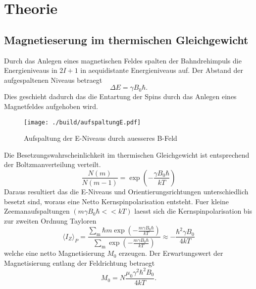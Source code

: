 \section{Theorie}%
\label{sec:theorie}

\subsection{Magnetieserung im thermischen Gleichgewicht}%
\label{ssub:magnetieserung_im_thermischen_gleichgewicht}
Durch das Anlegen eines magnetischen Feldes spalten der Bahndrehimpuls die Energieniveaus in $2 I
+ 1$ in aequidistante Energieniveaus auf. 
Der Abstand der aufgespaltenen Niveaus betraegt 
\begin{equation}
		\label{eq:delta_e}
		\Delta E = \gamma B_0 \hbar. 
\end{equation}
Dies geschieht dadurch das die Entartung der Spins durch das Anlegen eines
Magnetfeldes aufgehoben wird.
\begin{figure}[ht]
		\centering
		\texttt{[image: ./build/aufspaltungE.pdf]}
		\caption{Aufspaltung der E-Niveaus durch auesseres B-Feld}
		\label{fig:aufsp_E}
\end{figure}
Die Besetzungswahrscheinlichkeit im thermischen Gleichgewicht ist entsprechend
der Boltzmanverteilung verteilt.
\begin{equation}
		\label{eq:boltzmann}
		\frac{N(m)}{N(m-1)} = \exp \left( - \frac{\gamma B_0 \hbar}{kT} \right)
\end{equation}
Daraus resultiert das die E-Niveaus und Orientierungsrichtungen unterschiedlich
besetzt sind, woraus eine Netto Kernspinpolarisation entsteht. 
Fuer kleine Zeemanaufspaltungen $(m \gamma B_0 \hbar << kT)$ laesst sich die Kernspinpolarisation bis zur
zweiten Ordnung Tayloren 
\begin{equation}
		\label{eq:kernpo}
		\langle I_Z \rangle_P = \frac{\sum_\text{m} \hbar m \exp\left(-\frac{m \gamma B_0
		\hbar}{kT}\right)}{\sum_\text{m}\exp\left(-\frac{m \gamma B_0
		\hbar}{kT}\right)} \approx - \frac{\hbar^2 \gamma B_0}{4 kT}
\end{equation}
welche eine netto Magnetisierung $M_0$ erzeugen. 
Der Erwartungswert der Magnetisierung entlang der Feldrichtung betraegt
\begin{equation}
		\label{eq:magn}
		M_0 = N \frac{\mu_0 \gamma^2 \hbar^2 B_0}{4 kT} .
\end{equation}

